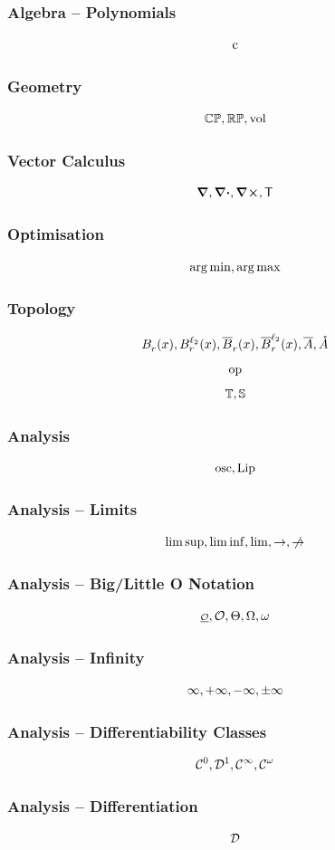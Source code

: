 \documentclass{beamer}
\begin{document}
\begin{frame}
    \frametitle{Algebra -- Polynomials}
    \[
        \operatorname{c}
    \]
\end{frame}

\begin{frame}
    \frametitle{Geometry}
    \[
        \mathbb{C}\mathbb{P}, \mathbb{R}\mathbb{P}, \operatorname{vol}
    \]
\end{frame}

\begin{frame}
    \frametitle{Vector Calculus}
    \[
        \grad, \div, \curl, \mathsf{T}
    \]
\end{frame}

\begin{frame}
    \frametitle{Optimisation}
    \[
        \operatorname*{arg\,min}, \operatorname*{arg\,max}
    \]
\end{frame}

\begin{frame}
    \frametitle{Topology}
    \[
        \oball{x}{r}, \oball[\ell_2]{x}{r}, \cball{x}{r}, \cball[\ell_2]{x}{r}, \closure{A}, \interior{A}
    \]
    \[
        \text{op}
    \]
    \[
        \mathbb{T}, \mathbb{S}
    \]
\end{frame}

\begin{frame}
    \frametitle{Analysis}
    \[
        \operatorname*{osc}, \operatorname*{Lip}
    \]
\end{frame}

\begin{frame}
    \frametitle{Analysis -- Limits}
    \[
        \limsup, \liminf, \lim, \to, \notto
    \]
\end{frame}

\begin{frame}
    \frametitle{Analysis -- Big/Little O Notation}
    \[
        \littleO, \bigO, \bigTheta, \bigOmega, \littleOmega
    \]
\end{frame}

\begin{frame}
    \frametitle{Analysis -- Infinity}
    \[
        \infty, +\infty, -\infty, \pm\infty
    \]    
\end{frame}

\begin{frame}
    \frametitle{Analysis -- Differentiability Classes}
    \[
        \mathcal{C}^{0}, \mathcal{D}^{1}, \mathcal{C}^{\infty}, \mathcal{C}^{\omega}
    \]
\end{frame}

\begin{frame}
    \frametitle{Analysis -- Differentiation}
    \[
        \mathcal{D}
    \]
\end{frame}
\end{document}
